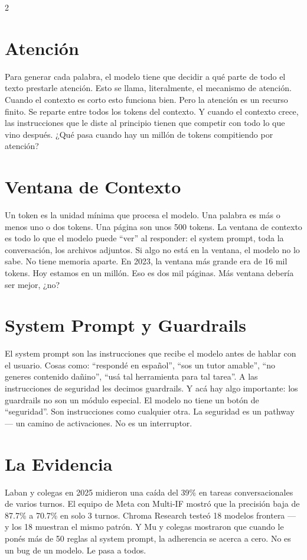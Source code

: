 \documentclass[10pt]{article}
\begin{document}
\begin{multicols}{2}
\section{Atenci\'on}
Para generar cada palabra, el modelo tiene que decidir a qu\'e parte de todo el texto prestarle atenci\'on. Esto se llama, literalmente, el mecanismo de atenci\'on. Cuando el contexto es corto esto funciona bien. Pero la atenci\'on es un recurso finito. Se reparte entre todos los tokens del contexto. Y cuando el contexto crece, las instrucciones que le diste al principio tienen que competir con todo lo que vino despu\'es. ¿Qu\'e pasa cuando hay un mill\'on de tokens compitiendo por atenci\'on?

\section{Ventana de Contexto}
Un token es la unidad m\'inima que procesa el modelo. Una palabra es m\'as o menos uno o dos tokens. Una p\'agina son unos 500 tokens. La ventana de contexto es todo lo que el modelo puede ``ver'' al responder: el system prompt, toda la conversaci\'on, los archivos adjuntos. Si algo no est\'a en la ventana, el modelo no lo sabe. No tiene memoria aparte. En 2023, la ventana m\'as grande era de 16 mil tokens. Hoy estamos en un mill\'on. Eso es dos mil p\'aginas. M\'as ventana deber\'ia ser mejor, ¿no?

\section{System Prompt y Guardrails}
El system prompt son las instrucciones que recibe el modelo antes de hablar con el usuario. Cosas como: ``respond\'e en espa\~nol'', ``sos un tutor amable'', ``no generes contenido da\~nino'', ``us\'a tal herramienta para tal tarea''. A las instrucciones de seguridad les decimos guardrails. Y ac\'a hay algo importante: los guardrails no son un m\'odulo especial. El modelo no tiene un bot\'on de ``seguridad''. Son instrucciones como cualquier otra. La seguridad es un pathway --- un camino de activaciones. No es un interruptor.

\section{La Evidencia}
Laban y colegas en 2025 midieron una ca\'ida del 39\% en tareas conversacionales de varios turnos. El equipo de Meta con Multi-IF mostr\'o que la precisi\'on baja de 87.7\% a 70.7\% en solo 3 turnos. Chroma Research teste\'o 18 modelos frontera --- y los 18 muestran el mismo patr\'on. Y Mu y colegas mostraron que cuando le pon\'es m\'as de 50 reglas al system prompt, la adherencia se acerca a cero. No es un bug de un modelo. Le pasa a todos.


\end{multicols}
\end{document}
